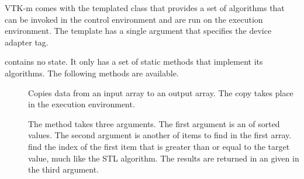 
VTK-m comes with the templated class  that
provides a set of algorithms that can be invoked in the control environment
and are run on the execution environment. The template has a single
argument that specifies the device adapter tag.


 contains no state. It only has a
set of static methods that implement its algorithms. The following methods
are available.

\begin{description}
\item[]  Copies data from an input array to an
  output array. The copy takes place in the execution environment.
\item[]  The
   method takes three arguments. The first argument
  is an  of sorted values. The second argument
  is another  of items to find in the first
  array.  find the index of the first item that is
  greater than or equal to the target value, much like the
   STL algorithm. The results are returned in
  an  given in the third argument.


\end{description}
